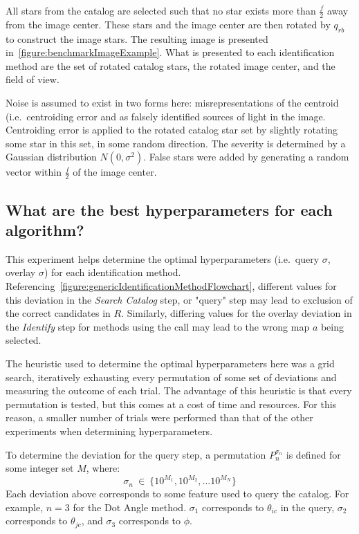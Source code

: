 All stars from the catalog are selected such that no star exists more than $\frac{f}{2}$ away from the image center.
These stars and the image center are then rotated by $q_{rb}$ to construct the image stars.
The resulting image is presented in~\autoref{figure:benchmarkImageExample}.
What is presented to each identification method are the set of rotated catalog stars, the rotated image center, and
the field of view.

Noise is assumed to exist in two forms here: misrepresentations of the centroid (i.e.\ centroiding error and as
falsely identified sources of light in the image.
Centroiding error is applied to the rotated catalog star set by slightly rotating some star in this set, in some
random direction.
The severity is determined by a Gaussian distribution $N(0, \sigma^2)$.
False stars were added by generating a random vector within $\frac{f}{2}$ of the image center.

\subsection{What are the best hyperparameters for each algorithm?}\label{subsec:hyperparameterSelectionMethods}
This experiment helps determine the optimal hyperparameters (i.e.\ query $\sigma$, overlay $\sigma$) for each
identification method.
Referencing~\autoref{figure:genericIdentificationMethodFlowchart}, different values for this deviation in the
\textit{Search Catalog} step, or "query" step may lead to exclusion of the correct candidates in $R$.
Similarly, differing values for the overlay deviation in the \textit{Identify} step for methods using the 
call may lead to the wrong map $a$ being selected.

The heuristic used to determine the optimal hyperparameters here was a grid search, iteratively exhausting every
permutation of some set of deviations and measuring the outcome of each trial.
The advantage of this heuristic is that every permutation is tested, but this comes at a cost of time and resources.
For this reason, a smaller number of trials were performed than that of the other experiments when determining
hyperparameters.

To determine the deviation for the query step, a permutation $P_n^{\sigma_n}$ is defined for some integer set $M$,
where:
\begin{equation}
    \label{eq:gridSearchQuery}
    \sigma_n \ \in \ \{ 10^{M_1}, 10^{M_2}, \ldots 10^{M_N} \}
\end{equation}
Each deviation above corresponds to some feature used to query the catalog.
For example, $n = 3$ for the Dot Angle method.
$\sigma_1$ corresponds to $\theta_{ic}$ in the query, $\sigma_2$ corresponds to $\theta_{jc}$, and $\sigma_3$ corresponds to $\phi$.

